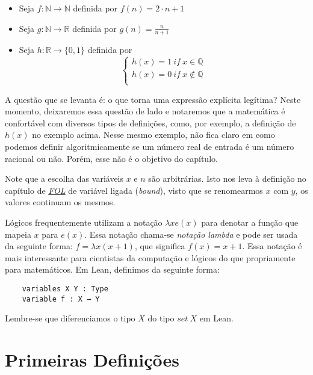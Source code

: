 \begin{itemize}
    \item Seja $f: \mathbb{N} \to \mathbb{N}$ definida por 
    $f(n) = 2\cdot n + 1$
    \item Seja $g : \mathbb{N} \to \mathbb{R}$ definida por 
    $g(n) = \frac{n}{n+1}$
    \item Seja $h : \mathbb{R} \to \{0,1\}$ definida por 
    $$\left \{ \begin{array}{c}
    h(x) = 1 ~if~x \in \mathbb{Q} \\
    h(x) = 0 ~ if ~ x \not \in \mathbb{Q} \\
    \end{array}
    \right. $$
 \end{itemize}

A questão que se levanta é: o que torna uma expressão explícita legítima? 
Neste momento, deixaremos essa questão de lado e notaremos que a matemática 
é confortável com diversos tipos de definições, como, por exemplo, a definição 
de $h(x)$ no exemplo acima. Nesse mesmo exemplo, não fica claro em como podemos 
definir algoritmicamente se um número real de entrada é um número racional ou não.
Porém, esse não é o objetivo do capítulo.

Note que a escolha das variáveis $x$ e $n$ são arbitrárias. 
Isto nos leva à definição no capítulo de \textit{\hyperlink{chapter.2}{FOL}} de 
variável ligada (\textit{bound}), visto que se renomearmos $x$ com $y$, os valores
continuam os mesmos. 

Lógicos frequentemente utilizam a notação $\lambda x e(x)$ para denotar a função
que mapeia $x$ para $e(x)$. Essa notação chama-se \textit{notação lambda} e pode 
ser usada da seguinte forma: $f = \lambda x(x + 1)$, que significa $f(x) = x + 1$. 
Essa notação é mais interessante para cientistas da computação e lógicos do que 
propriamente para matemáticos. Em Lean, definimos da seguinte forma: 

\begin{lstlisting}
    variables X Y : Type
    variable f : X → Y    
\end{lstlisting}

Lembre-se que diferenciamos o tipo $X$ do tipo $set~X$ em Lean.

\section{Primeiras Definições}

\theoremstyle{definition}
\newtheorem{definition}{Definição}[section]


